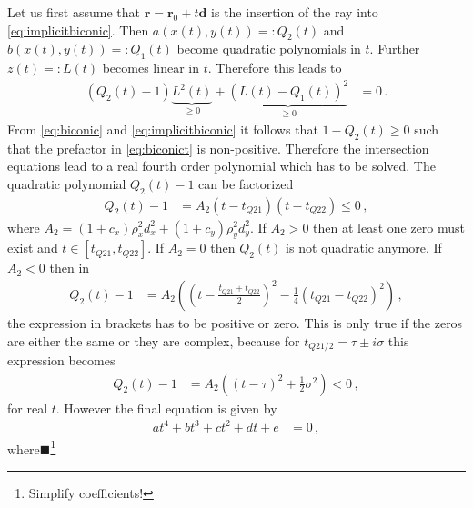 \documentclass[12pt,a4paper,twoside,openright,BCOR10mm,headsepline,titlepage,abstracton,chapterprefix,final]{scrreprt}
\newcommand\Vector[1]{{\mathbf{#1}}}
\newcommand{\remark}[1]{{\color{red}$\blacksquare$}\footnote{{\color{red}#1}}}
\begin{document}
Let us first assume that $\Vector{r} = \Vector{r}_0 + t \Vector{d}$ is the insertion of the ray into
\eqref{eq:implicitbiconic}. Then $a(x(t), y(t)) =: Q_2(t)$ and $b(x(t), y(t)) =: Q_1(t)$ become quadratic polynomials 
in $t$. Further $z(t) =: L(t)$ becomes linear in $t$. Therefore this leads to
\begin{align}
 (Q_2(t) - 1) \underbrace{L^2(t)}_{\ge0} + \underbrace{(L(t) - Q_1(t))^2}_{\ge0} &= 0\,.\label{eq:biconict}
\end{align}
From \eqref{eq:biconic} and \eqref{eq:implicitbiconic} it follows that $1 - Q_2(t) \ge 0$ such that the
prefactor in \eqref{eq:biconict} is non-positive. Therefore the intersection equations lead to a real
fourth order polynomial which has to be solved. The quadratic polynomial $Q_2(t) - 1$ can be factorized
\begin{align}
 Q_2(t) - 1 &= A_2 (t - t_{Q21})(t - t_{Q22}) \le 0\,,
\end{align}
where $A_2 = (1 + c_x) \rho_x^2 d_x^2 + (1 + c_y) \rho_y^2 d_y^2$. If $A_2 > 0$ then at least one zero must exist and
$t \in [t_{Q21}, t_{Q22}]$. If $A_2 = 0$ then $Q_2(t)$ is not quadratic anymore. If $A_2 < 0$ then in 
\begin{align}
 Q_2(t) - 1 &= A_2 \left(\left(t-\frac{t_{Q21} + t_{Q22}}{2}\right)^2 - \frac{1}{4}(t_{Q21} - t_{Q22})^2\right)\,,
\end{align}
the expression in brackets has to be positive or zero. This is only true if the zeros are either the same or they are complex, because
for $t_{Q21/2} = \tau \pm i \sigma$ this expression becomes
\begin{align}
 Q_2(t) - 1 &= A_2 \left(\left(t-\tau\right)^2 + \frac{1}{2}\sigma^2\right)<0\,,
\end{align}
for real $t$. However the final equation is given by
\begin{align}
 a t^4 + b t^3 + c t^2 + d t + e &= 0\,,
\end{align}
where\remark{Simplify coefficients!}
\end{document}
